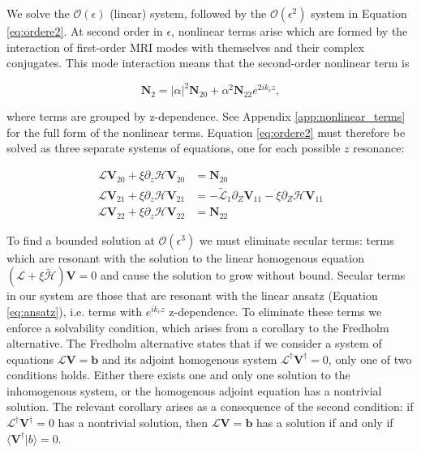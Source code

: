 \documentclass{emulateapj}
\newcommand{\beq}{\begin{equation}}
\newcommand{\eeq}{\end{equation}}
\begin{document}
We solve the $\mathcal{O}(\epsilon)$ (linear) system, followed by the $\mathcal{O}(\epsilon^2)$ system in Equation \ref{eq:ordere2}. At second order in $\epsilon$, nonlinear terms arise which are formed by the interaction of first-order MRI modes with themselves and their complex conjugates. This mode interaction means that the second-order nonlinear term is 

\beq
\mathbf{N}_2 = |\alpha|^2 \mathbf{N}_{20} + \alpha^2 \mathbf{N}_{22} e^{2 i k_c z},
\eeq

where terms are grouped by z-dependence. See Appendix \ref{app:nonlinear_terms} for the full form of the nonlinear terms. Equation \ref{eq:ordere2} must therefore be solved as three separate systems of equations, one for each possible $z$ resonance: 

\begin{align}
\mathcal{L}\mathbf{V}_{20} + \xi \partial_z \mathcal{H} \mathbf{V}_{20} & = \mathbf{N}_{20}\\
\mathcal{L}\mathbf{V}_{21} + \xi \partial_z \mathcal{H} \mathbf{V}_{21} & = - \widetilde{\mathcal{L}}_1 \partial_Z \mathbf{V}_{11} - \xi \partial_Z \mathcal{H} \mathbf{V}_{11} \\
\mathcal{L}\mathbf{V}_{22} + \xi \partial_z \mathcal{H} \mathbf{V}_{22} & = \mathbf{N}_{22}
\end{align}



To find a bounded solution at $\mathcal{O}(\epsilon^3)$ we must eliminate secular terms: terms which are resonant with the solution to the linear homogenous equation $(\mathcal{L} + \xi \widetilde{\mathcal{H}}) \mathbf{V} = 0$ and cause the solution to grow without bound. Secular terms in our system are those that are resonant with the linear ansatz (Equation \ref{eq:ansatz}), i.e. terms with $e^{i k_c z}$ z-dependence. To eliminate these terms we enforce a solvability condition, which arises from a corollary to the Fredholm alternative. The Fredholm alternative states that if we consider a system of equations $\mathcal{L} \mathbf{V} = \mathbf{b}$ and its adjoint homogenous system $\mathcal{L}^\dagger \mathbf{V}^\dagger = 0$, only one of two conditions holds. Either there exists one and only one solution to the inhomogenous system, or the homogenous adjoint equation has a nontrivial solution. The relevant corollary arises as a consequence of the second condition: if $\mathcal{L}^\dagger \mathbf{V}^\dagger = 0$ has a nontrivial solution, then $\mathcal{L} \mathbf{V} = \mathbf{b}$ has a solution if and only if $\langle \mathbf{V}^\dagger | b \rangle = 0$. 
\end{document}
